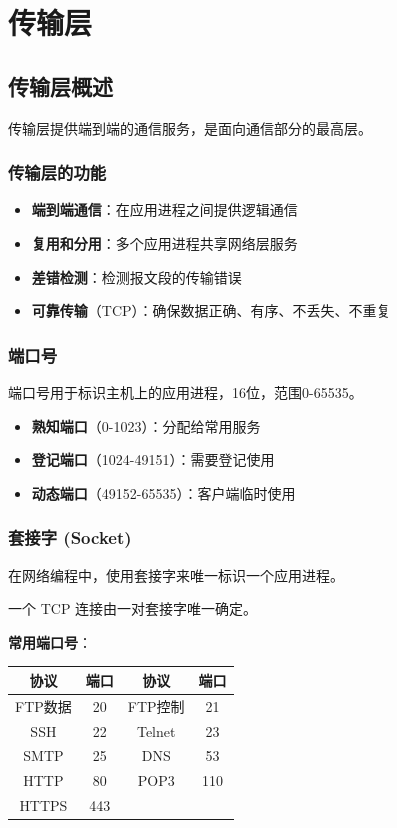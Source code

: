 \chapter{传输层}
\section{传输层概述}
传输层提供端到端的通信服务，是面向通信部分的最高层。

\subsection{传输层的功能}
\begin{itemize}[leftmargin=2em,itemsep=0pt]
    \item \textbf{端到端通信}：在应用进程之间提供逻辑通信
    \item \textbf{复用和分用}：多个应用进程共享网络层服务
    \item \textbf{差错检测}：检测报文段的传输错误
    \item \textbf{可靠传输}（TCP）：确保数据正确、有序、不丢失、不重复
\end{itemize}

\subsection{端口号}
端口号用于标识主机上的应用进程，16位，范围0-65535。

\begin{itemize}[leftmargin=2em,itemsep=0pt]
    \item \textbf{熟知端口}（0-1023）：分配给常用服务
    \item \textbf{登记端口}（1024-49151）：需要登记使用
    \item \textbf{动态端口}（49152-65535）：客户端临时使用
\end{itemize}

\subsection{套接字 (Socket)}
在网络编程中，使用套接字来唯一标识一个应用进程。
\begin{center}
\end{center}
一个 TCP 连接由一对套接字唯一确定。

\textbf{常用端口号}：
\begin{table}[htbp]
\centering\small
\begin{tabular}{cccc}
\toprule
\textbf{协议} & \textbf{端口} & \textbf{协议} & \textbf{端口} \\
\midrule
FTP数据 & 20 & FTP控制 & 21 \\
SSH & 22 & Telnet & 23 \\
SMTP & 25 & DNS & 53 \\
HTTP & 80 & POP3 & 110 \\
HTTPS & 443 & & \\
\bottomrule
\end{tabular}
\end{table}

